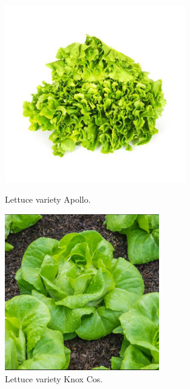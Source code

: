 \begin{figure}[ht!]
    \centering

    \begin{minipage}[b]{0.45\textwidth}
        \centering
        \includegraphics[width=0.7\textwidth]{img/lechuga_apollo.png}
        \caption{Lettuce variety Apollo.}
        \label{fig:apollo}
    \end{minipage}
    \hfill
    \begin{minipage}[b]{0.45\textwidth}
        \centering
        \includegraphics[width=0.6\textwidth]{img/lechuga_knox.png}
        \caption{Lettuce variety Knox Cos.}
        \label{fig:knox}
    \end{minipage}

\end{figure}

